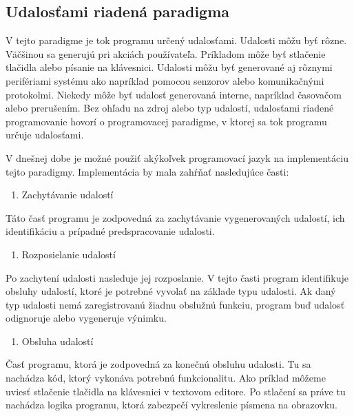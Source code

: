 \subsection{Udalosťami riadená paradigma}
\noindent \par
V tejto paradigme je tok programu určený udalosťami. Udalosti môžu byť
rôzne. Väčšinou sa generujú pri akciách používateľa. Príkladom môže byť stlačenie tlačidla
alebo písanie na klávesnici. Udalosti môžu byť generované aj rôznymi perifériami systému ako napríklad pomocou senzorov alebo komunikačnými protokolmi. Niekedy môže byť udalosť generovaná interne, napríklad časovačom alebo prerušením. Bez ohľadu na
zdroj alebo typ udalostí, udalosťami riadené programovanie
hovorí o programovacej paradigme, v ktorej sa tok
programu určuje udalosťami.
\par V dnešnej dobe je možné použiť akýkoľvek programovací jazyk na implementáciu tejto paradigmy. Implementácia by mala zahŕňať nasledujúce časti:
\begin{enumerate}
  \item Zachytávanie udalostí
\end{enumerate}

\noindent \par
Táto časť programu je zodpovedná za zachytávanie vygenerovaných udalostí, ich identifikáciu a prípadné predspracovanie udalosti.

\begin{enumerate}[resume]
  \item Rozposielanie udalostí
\end{enumerate}

\noindent \par
Po zachytení udalosti nasleduje jej rozposlanie. V tejto časti program identifikuje obsluhy udalostí, ktoré je potrebné vyvolať na základe typu udalosti. Ak daný typ udalosti nemá zaregistrovanú žiadnu obslužnú funkciu, program buď udalosť odignoruje alebo vygeneruje výnimku.

\begin{enumerate}[resume]
  \item Obsluha udalostí
\end{enumerate}

\noindent \par
Časť programu, ktorá je zodpovedná za konečnú obsluhu udalosti. Tu sa nachádza kód, ktorý vykonáva potrebnú funkcionalitu. Ako príklad môžeme uviesť stlačenie tlačidla na klávesnici v textovom editore. Po stlačení sa práve tu nachádza logika programu, ktorá zabezpečí vykreslenie písmena na obrazovku.

